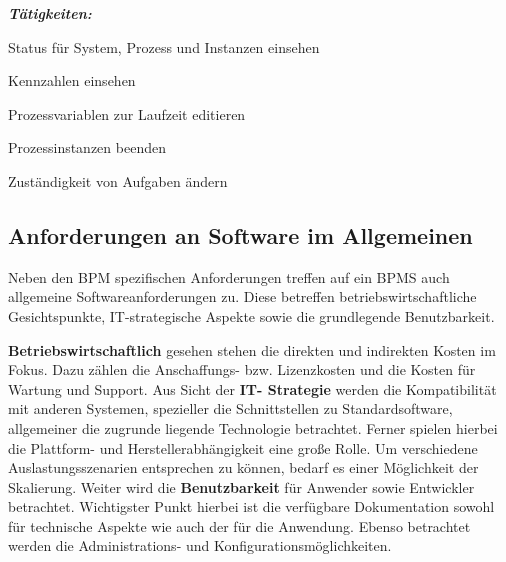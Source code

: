 \medskip\textit{\textbf{Tätigkeiten:}}
\begin{compactitem}
\item[] Status für System, Prozess und Instanzen einsehen
\item[] Kennzahlen einsehen
\item[] Prozessvariablen zur Laufzeit editieren
\item[] Prozessinstanzen beenden
\item[] Zuständigkeit von Aufgaben ändern
\end{compactitem}

%
%
%

\subsection{Anforderungen an Software im Allgemeinen}
\label{SoftwareAnforderugen}
Neben den \ac{BPM} spezifischen Anforderungen treffen auf ein \ac{BPMS} auch allgemeine Softwareanforderungen zu. Diese betreffen  betriebswirtschaftliche Gesichtspunkte, IT-strategische Aspekte sowie die grundlegende Benutzbarkeit.

\textbf{Betriebswirtschaftlich} gesehen stehen die direkten und indirekten Kosten im Fokus. Dazu zählen die Anschaffungs- bzw. Lizenzkosten und die Kosten für Wartung und Support. 
Aus Sicht der \textbf{IT- Strategie} werden die Kompatibilität mit anderen Systemen, spezieller die Schnittstellen zu Standardsoftware, allgemeiner die zugrunde liegende Technologie betrachtet. Ferner spielen hierbei die Plattform- und Herstellerabhängigkeit eine große Rolle. Um verschiedene Auslastungsszenarien entsprechen zu können, bedarf es einer Möglichkeit der Skalierung. Weiter wird die \textbf{Benutzbarkeit} für Anwender sowie Entwickler betrachtet. Wichtigster Punkt hierbei ist die verfügbare Dokumentation sowohl für technische Aspekte wie auch der für die Anwendung. Ebenso betrachtet werden die Administrations- und Konfigurationsmöglichkeiten.
\newline



